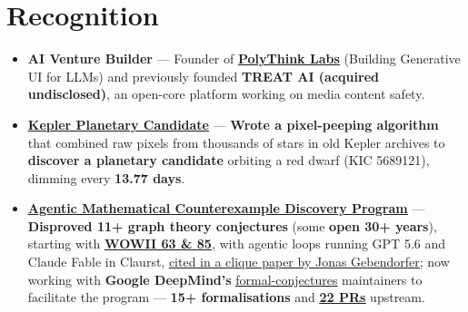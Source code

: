 \documentclass[letterpaper,11pt]{article}
\let\oldhref\href
\renewcommand{\href}[2]{\oldhref{#1}{\textcolor{linknavy}{\uline{#2}}}}
\newcommand{\resumeSubHeadingListStart}{\begin{itemize}[leftmargin=*, itemsep=3pt, parsep=0pt, topsep=3.5pt]}
\newcommand{\resumeSubHeadingListEnd}{\end{itemize}}
\begin{document}
\section*{Recognition}
\begin{small}
\resumeSubHeadingListStart

\item\textbf{AI Venture Builder} — Founder of \textbf{\href{https://www.polyth.ink/}{PolyThink Labs}} (Building Generative UI for LLMs) and previously founded \textbf{TREAT AI (acquired undisclosed)}, an open-core platform working on media content safety.

\item\textbf{\href{https://kuber.studio/planethunt/}{Kepler Planetary Candidate}} — \textbf{Wrote a pixel-peeping algorithm} that combined raw pixels from thousands of stars in old Kepler archives to \textbf{discover a planetary candidate} orbiting a red dwarf (KIC 5689121), dimming every \textbf{13.77 days}.

\item \textbf{\href{https://github.com/Kuberwastaken/c5-k4}{Agentic Mathematical Counterexample Discovery Program}} — \textbf{Disproved 11+ graph theory conjectures} (some \textbf{open 30+ years}), starting with \textbf{\href{https://github.com/google-deepmind/formal-conjectures/pull/4592}{WOWII 63 \& 85}}, with agentic loops running GPT 5.6 and Claude Fable in Claurst, \href{https://www.researchgate.net/publication/411040212_Clique_Blow-ups_of_the_5-Cycle_and_Written_on_the_Wall_II_Conjecture_64}{cited in a clique paper by Jonas Gebendorfer}; now working with \textbf{Google DeepMind's} \href{https://github.com/google-deepmind/formal-conjectures}{formal-conjectures} maintainers to facilitate the program — \textbf{15+ formalisations} and \textbf{\href{https://github.com/google-deepmind/formal-conjectures/pulls?q=is:pr+author:Kuberwastaken}{22 PRs}} upstream.

\resumeSubHeadingListEnd
\end{small}
\end{document}
